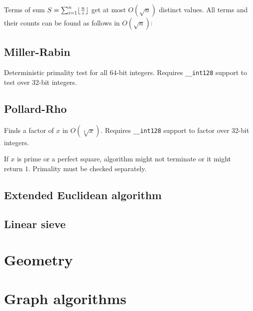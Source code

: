 \documentclass{article}
\DeclarePairedDelimiter\floor{\lfloor}{\rfloor} %
\begin{document}
Terms of sum $S = \sum_{i=1}^{n} \floor{\frac{n}{i}}$ get at most $O(\sqrt{n})$ distinct values. All terms and their counts can be found as follows in $O(\sqrt{n})$:



\subsection {Miller-Rabin}

Deterministic primality test for all $64$-bit integers. Requires \verb|__int128| support to test over 32-bit integers.



\subsection {Pollard-Rho}

Finds a factor of $x$ in $O(\sqrt[4]{x})$. Requires \verb|__int128| support to factor over 32-bit integers.

If $x$ is prime or a perfect square, algorithm might not terminate or it might return $1$. Primality must be checked separately.



\subsection {Extended Euclidean algorithm}



\subsection {Linear sieve}



\section {Geometry}



\section {Graph algorithms}
\end{document}
